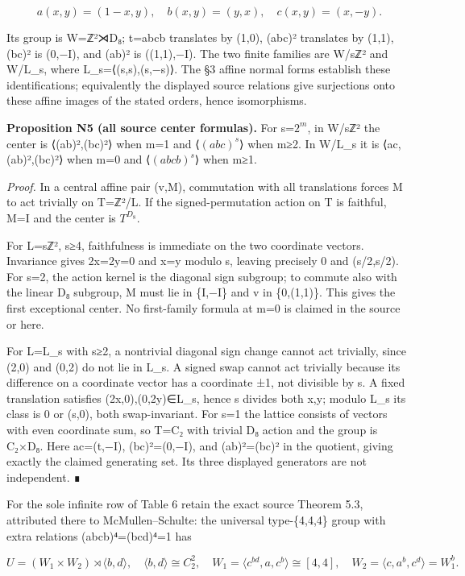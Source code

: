 \documentclass[
  11pt,
  a4paper,
]{article}
\begin{document}
\[
a(x,y)=(1-x,y),\quad b(x,y)=(y,x),\quad c(x,y)=(x,-y).
\tag{N5}
\]

Its group is W=ℤ²⋊D₈; t=abcb translates by (1,0), (abc)² translates by
(1,1), (bc)² is (0,−I), and (ab)² is ((1,1),−I). The two finite families
are W/sℤ² and W/L\_s, where L\_s=⟨(s,s),(s,−s)⟩. The §3 affine normal
forms establish these identifications; equivalently the displayed source
relations give surjections onto these affine images of the stated
orders, hence isomorphisms.

\textbf{Proposition N5 (all source center formulas).} For s=\(2^{m}\),
in W/sℤ² the center is ⟨(ab)²,(bc)²⟩ when m=1 and ⟨\((abc)^{s}\)⟩ when
m≥2. In W/L\_s it is ⟨ac,(ab)²,(bc)²⟩ when m=0 and ⟨\((abcb)^{s}\)⟩ when
m≥1.

\emph{Proof.} In a central affine pair (v,M), commutation with all
translations forces M to act trivially on T=ℤ²/L. If the
signed-permutation action on T is faithful, M=I and the center is
\(T^{D_8}\).

For L=sℤ², s≥4, faithfulness is immediate on the two coordinate vectors.
Invariance gives 2x=2y=0 and x=y modulo s, leaving precisely 0 and
(s/2,s/2). For s=2, the action kernel is the diagonal sign subgroup; to
commute also with the linear D₈ subgroup, M must lie in \{I,−I\} and v
in \{0,(1,1)\}. This gives the first exceptional center. No first-family
formula at m=0 is claimed in the source or here.

For L=L\_s with s≥2, a nontrivial diagonal sign change cannot act
trivially, since (2,0) and (0,2) do not lie in L\_s. A signed swap
cannot act trivially because its difference on a coordinate vector has a
coordinate ±1, not divisible by s. A fixed translation satisfies
(2x,0),(0,2y)∈L\_s, hence s divides both x,y; modulo L\_s its class is 0
or (s,0), both swap-invariant. For s=1 the lattice consists of vectors
with even coordinate sum, so T=C₂ with trivial D₈ action and the group
is C₂×D₈. Here ac=(t,−I), (bc)²=(0,−I), and (ab)²=(bc)² in the quotient,
giving exactly the claimed generating set. Its three displayed
generators are not independent. ∎

For the sole infinite row of Table 6 retain the exact source Theorem
5.3, attributed there to McMullen--Schulte: the universal type-\{4,4,4\}
group with extra relations (abcb)⁴=(bcd)⁴=1 has

\[
U=(W_1\times W_2)\rtimes\langle b,d\rangle,
\quad \langle b,d\rangle\cong C_2^2,\quad
W_1=\langle c^{bd},a,c^b\rangle\cong[4,4],\quad
W_2=\langle c,a^b,c^d\rangle=W_1^b.
\tag{N6}
\]
\end{document}
